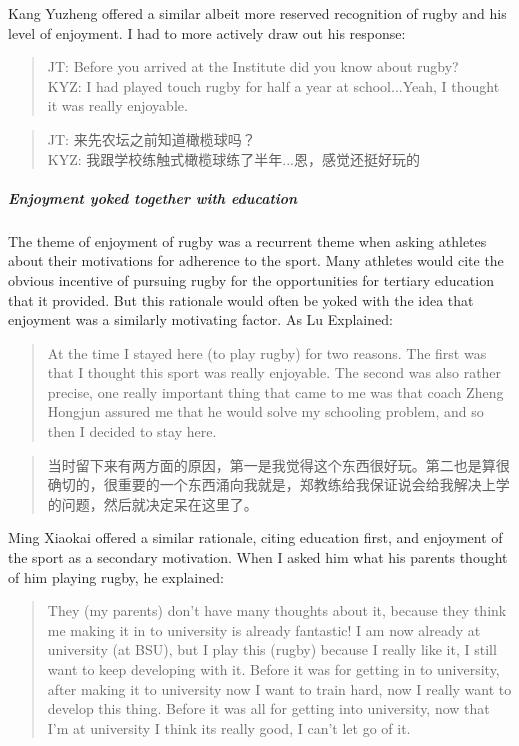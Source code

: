\begin{CJK}{UTF8}{gbsn}
Kang Yuzheng offered a similar albeit more reserved recognition of rugby and his level of enjoyment.  I had to more actively draw out his response:

      \begin{quotation}
        JT: Before you arrived at the Institute did you know about rugby?\\
        KYZ: I had played touch rugby for half a year at school...Yeah, I thought it was really enjoyable.
      \end{quotation}

      \begin{quotation}
        JT: 来先农坛之前知道橄榄球吗？\\
        KYZ: 我跟学校练触式橄榄球练了半年...恩，感觉还挺好玩的
      \end{quotation}


\subparagraph{Enjoyment yoked together with education}
The theme of enjoyment of rugby was a recurrent theme when asking athletes about their motivations for adherence to the sport.  Many athletes would cite the obvious incentive of pursuing rugby for the opportunities for tertiary education that it provided.  But this rationale would often be yoked with the idea that enjoyment was a similarly motivating factor.  As Lu Explained:

    \begin{quotation}
      At the time I stayed here (to play rugby) for two reasons.  The first was that I thought this sport was really enjoyable. The second was also rather precise, one really important thing that came to me was that coach Zheng Hongjun assured me that he would solve my schooling problem, and so then I decided to stay here.
    \end{quotation}

    \begin{quotation}
      当时留下来有两方面的原因，第一是我觉得这个东西很好玩。第二也是算很确切的，很重要的一个东西涌向我就是，郑教练给我保证说会给我解决上学的问题，然后就决定呆在这里了。 
    \end{quotation}

Ming Xiaokai offered a similar rationale, citing education first, and enjoyment of the sport as a secondary motivation.  When I asked him what his parents thought of him playing rugby, he explained:

    \begin{quotation}
      They (my parents) don't have many thoughts about it, because they think me making it in to university is already fantastic! I am now already at university (at BSU), but I play this (rugby) because I really like it, I still want to keep developing with it. Before it was for getting in to university, after making it to university now I want to train hard, now I really want to develop this thing.  Before it was all for getting into university, now that I'm at university I think its really good, I can't let go of it.
    \end{quotation}


\end{CJK}
